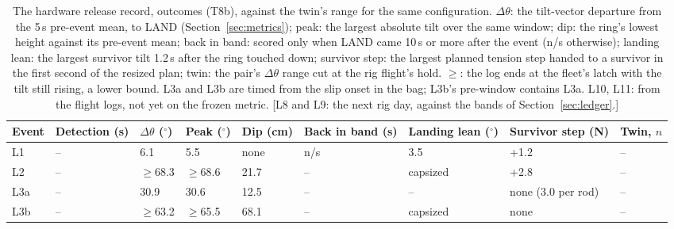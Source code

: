 \begin{table}[htbp]
  \centering
  \footnotesize
  \caption[The rig release record: outcomes]{The hardware release record, outcomes (T8b), against the twin's range for
  the same configuration. $\Delta\theta$: the tilt-vector departure from the 5\,s pre-event mean, to LAND
  (Section~\ref{sec:metrics}); peak: the largest absolute tilt over the same window; dip: the ring's lowest height
  against its pre-event mean; back in band: scored only when LAND came 10\,s or more after the event (n/s otherwise);
  landing lean: the largest survivor tilt 1.2\,s after the ring touched down; survivor step: the largest planned
  tension step handed to a survivor in the first second of the resized plan; twin: the pair's $\Delta\theta$ range cut
  at the rig flight's hold. $\geq$: the log ends at the fleet's latch with the tilt still rising, a lower bound. L3a
  and L3b are timed from the slip onset in the bag; L3b's pre-window contains L3a. L10, L11: from the flight logs, not
  yet on the frozen metric. [L8 and L9: the next rig day, against the bands of Section~\ref{sec:ledger}.]}
  \label{tab:T8b}
  \begin{tabularx}{\textwidth}{lYYYYYYYY}
    \toprule
    Event & Detection (s) & $\Delta\theta$ ($^\circ$) & Peak ($^\circ$) & Dip (cm) & Back in band (s) & Landing lean ($^\circ$)
      & Survivor step (N) & Twin, $n$ \\
    \midrule
    L1 & -- & 6.1 & 5.5 & none & n/s & 3.5 & +1.2 & -- \\ %
    L2 & -- & $\geq$68.3 & $\geq$68.6 & 21.7 & -- & capsized & +2.8 & -- \\ %
    L3a & -- & 30.9 & 30.6 & 12.5 & -- & -- & none (3.0 per rod) & -- \\ %
    L3b & -- & $\geq$63.2 & $\geq$65.5 & 68.1 & -- & capsized & none & -- \\ %

\end{tabularx}
\end{table}
